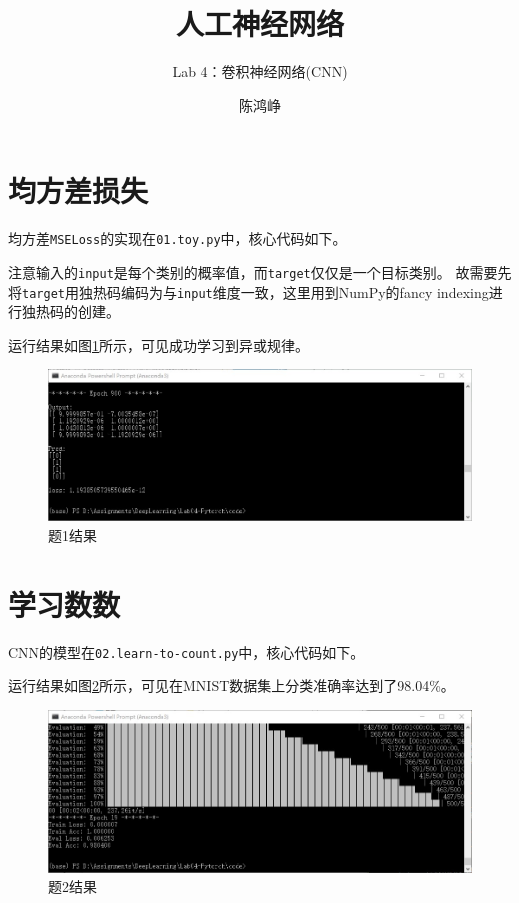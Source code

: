 \documentclass[logo,reportComp]{thesis}
\title{人工神经网络}
\subtitle{Lab 4：卷积神经网络(CNN)}
\author{陈鸿峥}
\begin{document}
\maketitle
\tableofcontents

\newpage

\section{均方差损失}
均方差\verb'MSELoss'的实现在\verb'01.toy.py'中，核心代码如下。



注意输入的\verb'input'是每个类别的概率值，而\verb'target'仅仅是一个目标类别。
故需要先将\verb'target'用独热码编码为与\verb'input'维度一致，这里用到NumPy的fancy indexing进行独热码的创建。

运行结果如图\ref{fig:t1}所示，可见成功学习到异或规律。
\begin{figure}[H]
\centering
\includegraphics[width=\linewidth]{fig/T1.jpg}
\caption{题1结果}
\label{fig:t1}
\end{figure}

\section{学习数数}
CNN的模型在\verb'02.learn-to-count.py'中，核心代码如下。



运行结果如图\ref{fig:t2}所示，可见在MNIST数据集上分类准确率达到了98.04\%。
\begin{figure}[H]
\centering
\includegraphics[width=\linewidth]{fig/T2.jpg}
\caption{题2结果}
\label{fig:t2}
\end{figure}
\end{document}
